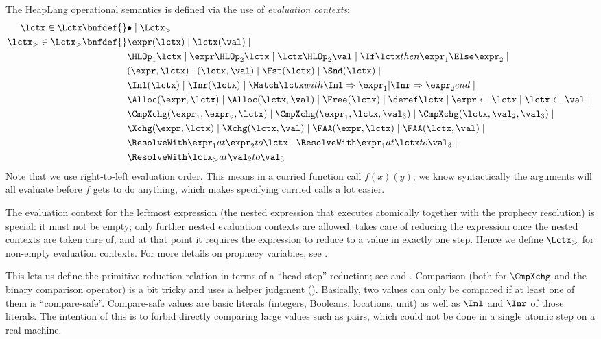 The HeapLang operational semantics is defined via the use of \emph{evaluation contexts}:
\begin{align*}
\lctx \in \Lctx \bnfdef{}&
  \bullet \mid \Lctx_{>} \\
\lctx_{>} \in \Lctx_{>} \bnfdef{}&
  \expr(\lctx) \mid
  \lctx (\val) \mid
  {}\\ &
  \HLOp_1 \lctx \mid
  \expr \HLOp_2 \lctx \mid
  \lctx \HLOp_2 \val \mid
  \If \lctx then \expr_1 \Else \expr_2 \mid
  {}\\ &
  (\expr, \lctx) \mid
  (\lctx, \val) \mid
  \Fst(\lctx) \mid
  \Snd(\lctx) \mid
  {}\\ &
  \Inl(\lctx) \mid
  \Inr(\lctx) \mid
  \Match \lctx with \Inl => \expr_1 | \Inr => \expr_2 end \mid
  {}\\ &
  \Alloc(\expr, \lctx) \mid
  \Alloc(\lctx, \val) \mid
  \Free(\lctx) \mid
  \deref \lctx \mid
  \expr \gets \lctx \mid
  \lctx \gets \val \mid
  {}\\ &
  \CmpXchg(\expr_1, \expr_2, \lctx) \mid
  \CmpXchg(\expr_1, \lctx, \val_3) \mid
  \CmpXchg(\lctx, \val_2, \val_3) \mid
  {}\\ &
  \Xchg(\expr, \lctx) \mid
  \Xchg(\lctx, \val) \mid
  \FAA(\expr, \lctx) \mid
  \FAA(\lctx, \val) \mid
  {}\\ &
  \ResolveWith \expr_1 at \expr_2 to \lctx \mid
  \ResolveWith \expr_1 at \lctx to \val_3 \mid
  {}\\ &
  \ResolveWith \lctx_{>} at \val_2 to \val_3
\end{align*}
Note that we use right-to-left evaluation order.
This means in a curried function call $f(x)(y)$, we know syntactically the arguments will all evaluate before $f$ gets to do anything, which makes specifying curried calls a lot easier.

The  evaluation context for the leftmost expression (the nested expression that executes atomically together with the prophecy resolution) is special: it must not be empty; only further nested evaluation contexts are allowed.
 takes care of reducing the expression once the nested contexts are taken care of, and at that point it requires the expression to reduce to a value in exactly one step.
Hence we define $\Lctx_{>}$ for non-empty evaluation contexts.
For more details on prophecy variables, see \cite{iris:prophecy}.

This lets us define the primitive reduction relation in terms of a ``head step'' reduction; see  and .
Comparison (both for $\CmpXchg$ and the binary comparison operator) is a bit tricky and uses a helper judgment ().
Basically, two values can only be compared if at least one of them is ``compare-safe''.
Compare-safe values are basic literals (integers, Booleans, locations, unit) as well as $\Inl$ and $\Inr$ of those literals.
The intention of this is to forbid directly comparing large values such as pairs, which could not be done in a single atomic step on a real machine.


